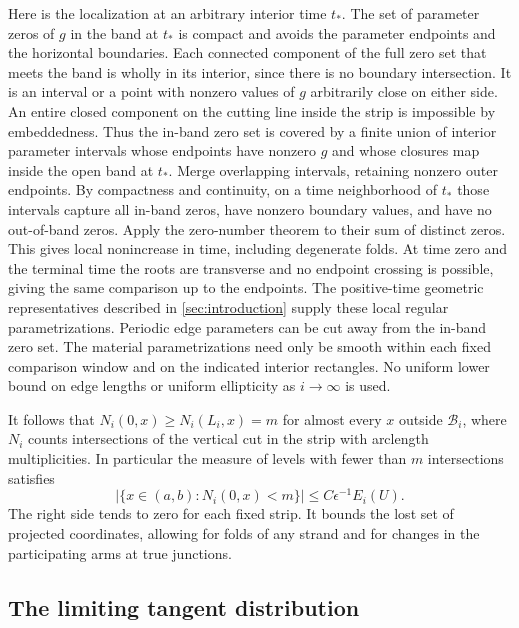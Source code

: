 Here is the localization at an arbitrary interior time \(t_*\). The set of parameter zeros of \(g\) in the band at \(t_*\) is compact and avoids the parameter endpoints and the horizontal boundaries. Each connected component of the full zero set that meets the band is wholly in its interior, since there is no boundary intersection. It is an interval or a point with nonzero values of \(g\) arbitrarily close on either side. An entire closed component on the cutting line inside the strip is impossible by embeddedness. Thus the in-band zero set is covered by a finite union of interior parameter intervals whose endpoints have nonzero \(g\) and whose closures map inside the open band at \(t_*\). Merge overlapping intervals, retaining nonzero outer endpoints. By compactness and continuity, on a time neighborhood of \(t_*\) those intervals capture all in-band zeros, have nonzero boundary values, and have no out-of-band zeros. Apply the zero-number theorem to their sum of distinct zeros. This gives local nonincrease in time, including degenerate folds. At time zero and the terminal time the roots are transverse and no endpoint crossing is possible, giving the same comparison up to the endpoints. The positive-time geometric representatives described in \cref{sec:introduction} supply these local regular parametrizations. Periodic edge parameters can be cut away from the in-band zero set. The material parametrizations need only be smooth within each fixed comparison window and on the indicated interior rectangles. No uniform lower bound on edge lengths or uniform ellipticity as \(i\to\infty\) is used.

It follows that \(N_i(0,x)\ge N_i(L_i,x)=m\) for almost every \(x\) outside \(\mathcal B_i\), where \(N_i\) counts intersections of the vertical cut in the strip with arclength multiplicities. In particular the measure of levels with fewer than \(m\) intersections satisfies \begin{equation}\label{eq:deficit}
\big|\{x\in(a,b): N_i(0,x)<m\}\big|\le C\epsilon^{-1}E_i(U).
\end{equation} The right side tends to zero for each fixed strip. It bounds the lost set of projected coordinates, allowing for folds of any strand and for changes in the participating arms at true junctions.

\subsection{The limiting tangent distribution}\label{sec:distribution}

